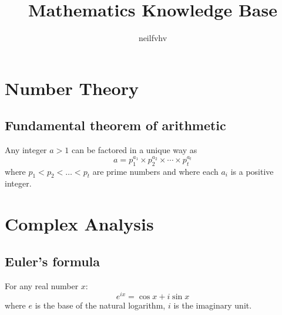 \documentclass[a4paper, 11pt]{article}
\title{Mathematics Knowledge Base}
\author{neilfvhv}
\begin{document}
\maketitle

\section{Number Theory}

    \subsection{Fundamental theorem of arithmetic}
        Any integer $a > 1$ can be factored in a unique way as
        $$
            a = p_1^{a_1} \times p_2^{a_2} \times \cdots \times p_t^{a_t}
        $$
        where $p_1 < p_2 < \ldots < p_t$ are prime numbers and where each $a_i$ is a positive integer.

\section{Complex Analysis}

    \subsection{Euler's formula}
        For any real number $x$:
        $$
            e^{i x} = \cos{x} + i \sin{x}
        $$
        where $e$ is the base of the natural logarithm, $i$ is the imaginary unit.
\end{document}

